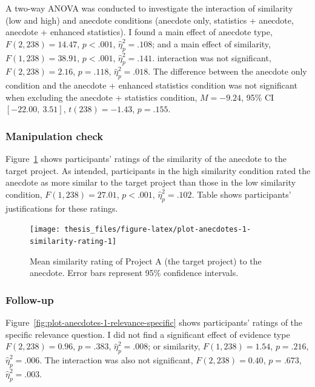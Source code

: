 \documentclass[a4paper, nobind, dvipsnames]{templates/ociamthesis}
\theoremstyle{definition}
\theoremstyle{definition}
\theoremstyle{definition}
\theoremstyle{definition}
\theoremstyle{remark}
\begin{document}
A two-way ANOVA was conducted to investigate the interaction of similarity (low
and high) and anecdote conditions (anecdote only, statistics + anecdote,
anecdote + enhanced statistics). I found a main effect of anecdote type,
\(F(2, 238) = 14.47\), \(p < .001\), \(\hat{\eta}^2_p = .108\); and a main effect of similarity,
\(F(1, 238) = 38.91\), \(p < .001\), \(\hat{\eta}^2_p = .141\). interaction was not significant,
\(F(2, 238) = 2.16\), \(p = .118\), \(\hat{\eta}^2_p = .018\). The difference between
the anecdote only condition and the anecdote + enhanced statistics condition was
not significant when excluding the anecdote + statistics condition,
\(M = -9.24\), 95\% CI \([-22.00,~3.51]\), \(t(238) = -1.43\), \(p = .155\).

\subsubsection{Manipulation check}

Figure~\ref{fig:plot-anecdotes-1-similarity-rating} shows participants' ratings
of the similarity of the anecdote to the target project. As intended,
participants in the high similarity condition rated the anecdote as more similar
to the target project than those in the low similarity condition,
\(F(1, 238) = 27.01\), \(p < .001\), \(\hat{\eta}^2_p = .102\). Table shows participants'
justifications for these ratings.



\begin{figure}
\texttt{[image: thesis\_files/figure-latex/plot-anecdotes-1-similarity-rating-1]} \caption{Mean similarity rating of Project A (the target project) to the anecdote. Error bars represent 95\% confidence intervals.}\label{fig:plot-anecdotes-1-similarity-rating}
\end{figure}

\subsubsection{Follow-up}

Figure~\ref{fig:plot-anecdotes-1-relevance-specific} shows participants' ratings
of the specific relevance question. I did not find a significant effect of
evidence type \(F(2, 238) = 0.96\), \(p = .383\), \(\hat{\eta}^2_p = .008\); or
similarity, \(F(1, 238) = 1.54\), \(p = .216\), \(\hat{\eta}^2_p = .006\). The
interaction was also not significant,
\(F(2, 238) = 0.40\), \(p = .673\), \(\hat{\eta}^2_p = .003\).
\end{document}
